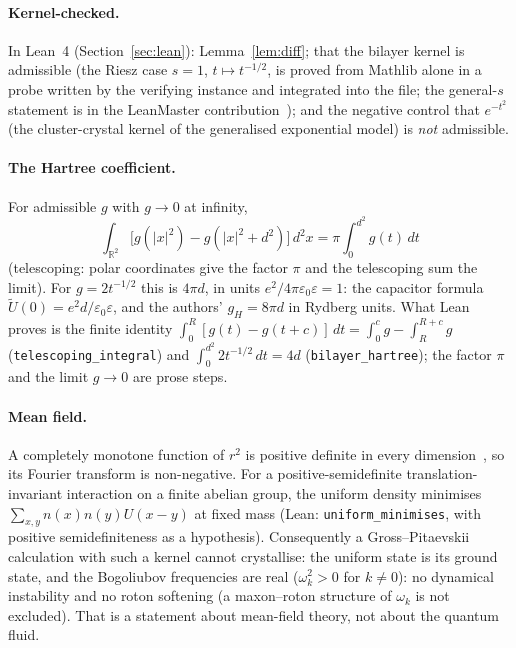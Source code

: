 \documentclass[11pt,a4paper]{article}
\begin{document}
\paragraph{Kernel-checked.} In Lean~4 (Section~\ref{sec:lean}): Lemma~\ref{lem:diff}; that the bilayer kernel is admissible (the
Riesz case $s=1$, $t\mapsto t^{-1/2}$, is proved from Mathlib alone in a probe written by the verifying instance and integrated
into the file; the general-$s$ statement is in the LeanMaster contribution~\cite{LeanMaster2026}); and the negative control that
$e^{-t^2}$ (the cluster-crystal kernel of the generalised exponential model) is \emph{not} admissible.

\paragraph{The Hartree coefficient.} For admissible $g$ with $g\to0$ at infinity,
\begin{equation}\label{eq:hartree}
\int_{\mathbb R^2}\!\big[g(|x|^2)-g(|x|^2+d^2)\big]\,d^2x=\pi\!\int_0^{d^2}\!g(t)\,dt
\end{equation}
(telescoping: polar coordinates give the factor $\pi$ and the telescoping sum the limit). For $g=2t^{-1/2}$ this is $4\pi d$, in units
$e^2/4\pi\varepsilon_0\varepsilon=1$: the capacitor formula $\tilde U(0)=e^2d/\varepsilon_0\varepsilon$, and the authors' $g_H=8\pi d$ in
Rydberg units. What Lean proves is the finite identity $\int_0^R[g(t)-g(t+c)]\,dt=\int_0^cg-\int_R^{R+c}g$ (\texttt{telescoping\_integral})
and $\int_0^{d^2}2t^{-1/2}\,dt=4d$ (\texttt{bilayer\_hartree}); the factor $\pi$ and the limit $g\to0$ are prose steps.

\paragraph{Mean field.} A completely monotone function of $r^2$ is positive definite in every dimension~\cite{Schoenberg1938}, so its Fourier
transform is non-negative. For a positive-semidefinite translation-invariant interaction on a finite abelian group, the uniform density
minimises $\sum_{x,y}n(x)n(y)U(x-y)$ at fixed mass (Lean: \texttt{uniform\_minimises}, with positive semidefiniteness as a hypothesis).
Consequently a Gross--Pitaevskii calculation with such a kernel cannot crystallise: the uniform state is its ground state, and the
Bogoliubov frequencies are real ($\omega_k^2>0$ for $k\ne0$): no dynamical instability and no roton softening (a maxon--roton
structure of $\omega_k$ is not excluded). That is a statement about mean-field theory, not about the quantum fluid.
\end{document}
